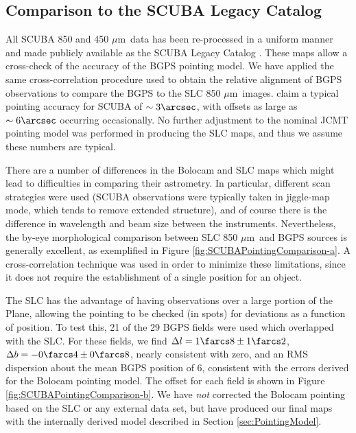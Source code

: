 \documentclass[12pt,preprint]{aastex}
\newcommand{\mum}{\ensuremath{\mu \mathrm{m}}}
\begin{document}
\subsection{Comparison to the SCUBA Legacy Catalog}
\label{sec:SCUBAPointingComparison}

All SCUBA 850 and 450 \mum\ data has been re-processed in a uniform
manner and made publicly available as the SCUBA Legacy Catalog
\citep[][hereafter SLC]{difrancesco08}.  These maps allow a
cross-check of the accuracy of the BGPS pointing model.  We have
applied the same cross-correlation procedure used to obtain the
relative alignment of BGPS observations to compare the BGPS to the SLC
850 \mum\ images.  \citet{difrancesco08} claim a typical pointing
accuracy for SCUBA of $\sim3\arcsec$, with offsets as large as
$\sim6\arcsec$ occurring occasionally.  No further adjustment to the
nominal JCMT pointing model was performed in producing the SLC maps,
and thus we assume these numbers are typical.

There are a number of differences in the Bolocam and SLC maps which
might lead to difficulties in comparing their astrometry.  In
particular, different scan strategies were used (SCUBA observations
were typically taken in jiggle-map mode, which tends to remove
extended structure), and of course there is the difference in
wavelength and beam size between the instruments.  Nevertheless, the
by-eye morphological comparison between SLC 850 \mum\ and BGPS sources
is generally excellent, as exemplified in Figure
\ref{fig:SCUBAPointingComparison-a}.  A cross-correlation technique
was used in order to minimize these limitations, since it does not
require the establishment of a single position for an object.

The SLC has the advantage of having observations over a large portion
of the Plane, allowing the pointing to be checked (in spots) for
deviations as a function of position.  To test this, 21 of the 29 BGPS
fields were used which overlapped with the SLC.  For these fields, we
find $\Delta l = 1\farcs8 \pm 1\farcs2$, $\Delta b = -0\farcs4 \pm
0\farcs8$, nearly consistent with zero, and an RMS dispersion about
the mean BGPS position of 6, consistent with the errors derived
for the Bolocam pointing model.  The offset for each field is shown in
Figure \ref{fig:SCUBAPointingComparison-b}.  We have {\it not}
corrected the Bolocam pointing based on the SLC or any external data
set, but have produced our final maps with the internally derived
model described in Section \ref{sec:PointingModel}.
\end{document}
